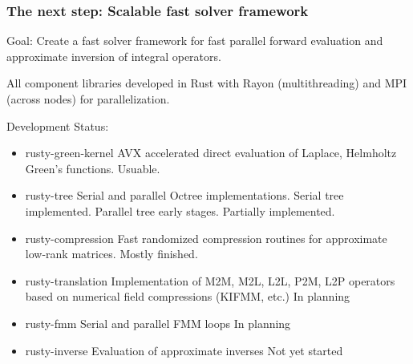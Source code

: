 \documentclass[dvipsnames,10pt]{beamer}
\begin{document}
\begin{frame}
    \frametitle{The next step: Scalable fast solver framework}

    \vspace{.1cm}
    Goal: Create a fast solver framework for fast parallel forward evaluation and
    approximate inversion of integral operators.

    \vspace{\baselineskip} 

    {\color{blue} All component libraries developed in Rust with Rayon (multithreading)
    and MPI (across nodes) for parallelization.}
    \vspace{\baselineskip}

    Development Status:
    \begin{itemize}
    \item {\color{blue} rusty-green-kernel} AVX accelerated direct evaluation
        of Laplace, Helmholtz Green's functions. {\color{green} Usuable}.
    \item {\color{blue} rusty-tree} Serial and parallel Octree implementations.
        Serial tree implemented. 
        Parallel tree early stages. {\color{yellow} Partially implemented}.
    \item {\color{blue} rusty-compression} Fast randomized compression routines
        for approximate low-rank matrices. {\color{yellow} Mostly finished.}
    \item {\color{blue} rusty-translation} Implementation of M2M, 
        M2L, L2L, P2M, L2P operators
        based on numerical field compressions (KIFMM, etc.)
        {\color{red} In planning}
    \item {\color{blue} rusty-fmm} Serial and parallel FMM loops 
        {\color{red} In planning}
    \item {\color{blue} rusty-inverse} Evaluation of approximate inverses 
        {\color{red} Not yet started}
    \end{itemize}

\end{frame}
\end{document}
